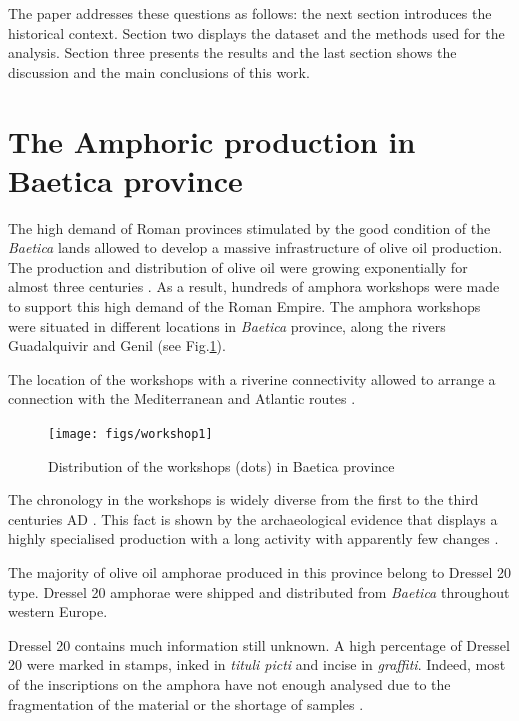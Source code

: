 \documentclass[review]{elsarticle}
\begin{document}
The paper addresses these questions as follows: the next section introduces the historical context. Section two displays the dataset and the methods used for the analysis. Section three presents the results and the last section shows the discussion and the main conclusions of this work. 


\section{The Amphoric production in Baetica province}

The high demand of Roman provinces stimulated by the good condition of the \textit{Baetica} lands allowed to develop a massive infrastructure of olive oil production. The production and distribution of olive oil were growing exponentially for almost three centuries \citep{remesal_concierto}. As a result, hundreds of amphora workshops were made to support this high demand of the Roman Empire. The amphora workshops were situated in different locations in \textit{Baetica} province, along the rivers Guadalquivir and Genil (see Fig.\ref{workshop}).

The location of the workshops with a riverine connectivity allowed to arrange a connection with the Mediterranean and Atlantic routes \citep{garcia_vargas_enrique_formal_2010}.

\begin{figure}[htp]
	\centering
\texttt{[image: figs/workshop1]}
\caption{Distribution of the workshops (dots) in Baetica province}
\label{workshop}
\end{figure} 


The chronology in the workshops is widely diverse from the first to the third centuries AD \citep{millet_anforas_1998,rodriguez_baetican_1998,chic2005comercio}. 
This fact is shown by the archaeological evidence that displays a highly specialised production with a long activity with apparently few changes \citep{remesal_anforas_2004}.


The majority of olive oil amphorae produced in this province belong to Dressel 20 type\citep{dressel_ricerche_1878,
millet_anforas_1998}. Dressel 20 amphorae were shipped and distributed from \textit{Baetica} throughout western Europe. 

Dressel 20 contains much information still unknown. A high percentage of  Dressel 20 were marked in stamps, inked in \textit{tituli picti} and incise in \textit{graffiti}. Indeed, most of the inscriptions on the amphora have not enough analysed due to the fragmentation of the material or the shortage of samples \citep{aguilera_evolucion_2007,rovira_guardiola_grafitos_2007}. 
\end{document}
